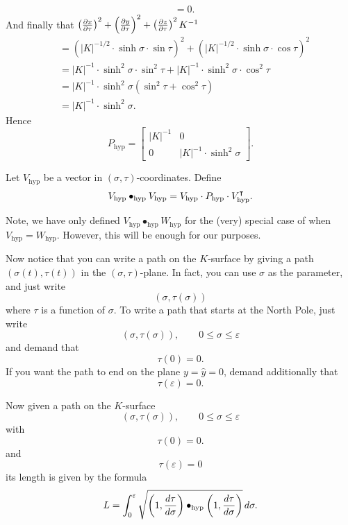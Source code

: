 \documentclass{ximera}
\begin{document}
\begin{problem}
\begin{freeResponse}
\begin{align*}
      &= 0.
    \end{align*}
    And finally that $\left(\pp[x]{\tau}\right)^2 + \left(\pp[y]{\tau}\right)^2 + \left(\pp[z]{\tau}\right)^2K^{-1}$
     \begin{align*}
       &= \left(|K|^{-1/2}\cdot \sinh\sigma\cdot \sin \tau \right)^2 + \left( |K|^{-1/2}\cdot \sinh\sigma\cdot \cos\tau \right)^2 \\
       &= |K|^{-1}\cdot \sinh^2\sigma\cdot \sin^2 \tau + |K|^{-1}\cdot \sinh^2\sigma\cdot \cos^2\tau \\
       &= |K|^{-1}\cdot \sinh^2\sigma\left(\sin^2 \tau + \cos^2\tau\right) \\
       &= |K|^{-1}\cdot \sinh^2\sigma.
     \end{align*}
     Hence
     \[
     P_\mathrm{hyp} =
  \begin{bmatrix}
    |K|^{-1} & 0 \\
    0 & |K|^{-1}\cdot\sinh^2 \sigma
  \end{bmatrix}.
     \]
  \end{freeResponse}
\end{problem}



\begin{definition}
  Let $V_\mathrm{hyp}$ be a vector in
  $(\sigma,\tau)$-coordinates. Define
  \[
  V_\mathrm{hyp} \bullet_\mathrm{hyp} V_\mathrm{hyp} = V_\mathrm{hyp} \cdot P_\mathrm{hyp} \cdot V_\mathrm{hyp}^\transpose.
  \]
\end{definition}

\begin{warning}
  Note, we have only defined $V_\mathrm{hyp}\bullet_\mathrm{hyp}
  W_\mathrm{hyp}$ for the (very) special case of when $V_\mathrm{hyp}
  = W_\mathrm{hyp}$. However, this will be enough for our purposes.
\end{warning}


Now notice that you can write a path on the $K$-surface by giving a
path $\left( \sigma(t),\tau(t)\right)$ in the
$(\sigma,\tau)$-plane. In fact, you can use $\sigma$ as the parameter,
and just write
\[
\left(\sigma,\tau(\sigma)\right)
\]
where $\tau$ is a function of $\sigma$. To write a path that starts at
the North Pole, just write
\[
\left(\sigma,\tau(\sigma)\right), \qquad 0\leq\sigma\leq\varepsilon
\]
and demand that
\[
\tau(0) =0.
\]
If you want the path to end on the plane $y=\hat{y}=0$, demand
additionally that
\[
\tau(\varepsilon) =0.
\]


 Now given a path on the $K$-surface
 \[
 \left(\sigma,\tau(\sigma)\right),\qquad0\leq\sigma \leq\varepsilon
 \]
 with
 \[
 \tau\left(  0\right)  =0.
 \]
 and%
 \[
 \tau\left(  \varepsilon\right)  =0
 \]
 its length is given by the formula%
\[
L=\int_{0}^{\varepsilon} \sqrt{\left(1,\dd[\tau]{\sigma}\right)\bullet_\mathrm{hyp} \left(1,\dd[\tau]{\sigma}\right)}\d\sigma.
\]
\end{document}
